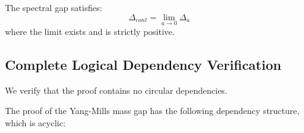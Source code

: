 \begin{corollary}
The spectral gap satisfies:
\begin{equation}
\Delta_{cont} = \lim_{a \to 0} \Delta_a
\end{equation}
where the limit exists and is strictly positive.
\end{corollary}


\subsection{Complete Logical Dependency Verification}
\label{subsec:logical_verification}

We verify that the proof contains no circular dependencies.

\begin{theorem}
\label{thm:non_circular}
The proof of the Yang-Mills mass gap has the following dependency structure, which is acyclic:
\end{theorem}

